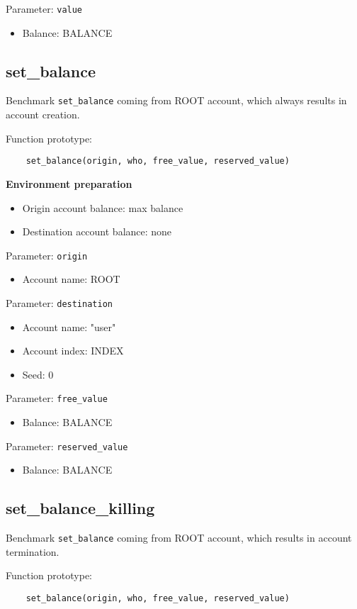 \documentclass[11pt,a4paper]{article}
\begin{document}
Parameter: \verb|value|
\begin{itemize}
\item Balance: BALANCE
\end{itemize}

\subsection{set\_balance}

Benchmark \verb|set_balance| coming from ROOT account, which always results in account creation.

Function prototype:

\begin{verbatim}
    set_balance(origin, who, free_value, reserved_value)
\end{verbatim}

\textbf{Environment preparation}
\begin{itemize}
\item Origin account balance: max balance
\item Destination account balance: none
\end{itemize}

Parameter: \verb|origin|
\begin{itemize}
\item Account name: ROOT
\end{itemize}

Parameter: \verb|destination|
\begin{itemize}
\item Account name: "user"
\item Account index: INDEX
\item Seed: 0
\end{itemize}

Parameter: \verb|free_value|
\begin{itemize}
\item Balance: BALANCE
\end{itemize}

Parameter: \verb|reserved_value|
\begin{itemize}
\item Balance: BALANCE
\end{itemize}

\subsection{set\_balance\_killing}

Benchmark \verb|set_balance| coming from ROOT account, which results in account termination.

Function prototype:

\begin{verbatim}
    set_balance(origin, who, free_value, reserved_value)
\end{verbatim}
\end{document}
